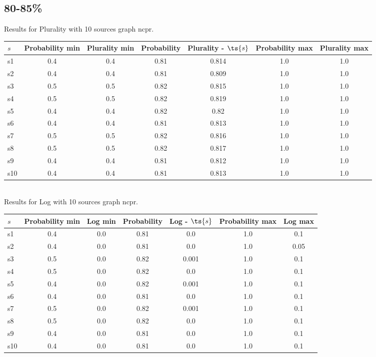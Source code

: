 \documentclass{article}
\begin{document}
\newpage

\subsection{80-85\%}

\noindent Results for Plurality with 10 sources graph ncpr.

\noindent\begin{tabular}{|l|c|c|c|c|c|c|}
\hline
$s$& Probability min & Plurality min & Probability & Plurality - $\ts{s}$ & Probability max & Plurality max\\
\hline
s1 &0.4 & 0.4 & 0.81 & 0.814 & 1.0 & 1.0\\
\hline
s2 &0.4 & 0.4 & 0.81 & 0.809 & 1.0 & 1.0\\
\hline
s3 &0.5 & 0.5 & 0.82 & 0.815 & 1.0 & 1.0\\
\hline
s4 &0.5 & 0.5 & 0.82 & 0.819 & 1.0 & 1.0\\
\hline
s5 &0.4 & 0.4 & 0.82 & 0.82 & 1.0 & 1.0\\
\hline
s6 &0.4 & 0.4 & 0.81 & 0.813 & 1.0 & 1.0\\
\hline
s7 &0.5 & 0.5 & 0.82 & 0.816 & 1.0 & 1.0\\
\hline
s8 &0.5 & 0.5 & 0.82 & 0.817 & 1.0 & 1.0\\
\hline
s9 &0.4 & 0.4 & 0.81 & 0.812 & 1.0 & 1.0\\
\hline
s10 &0.4 & 0.4 & 0.81 & 0.813 & 1.0 & 1.0\\
\hline
\end{tabular}\\

\noindent Results for Log with 10 sources graph ncpr.

\noindent\begin{tabular}{|l|c|c|c|c|c|c|}
\hline
$s$& Probability min & Log min & Probability & Log - $\ts{s}$ & Probability max & Log max\\
\hline
s1 &0.4 & 0.0 & 0.81 & 0.0 & 1.0 & 0.1\\
\hline
s2 &0.4 & 0.0 & 0.81 & 0.0 & 1.0 & 0.05\\
\hline
s3 &0.5 & 0.0 & 0.82 & 0.001 & 1.0 & 0.1\\
\hline
s4 &0.5 & 0.0 & 0.82 & 0.0 & 1.0 & 0.1\\
\hline
s5 &0.4 & 0.0 & 0.82 & 0.001 & 1.0 & 0.1\\
\hline
s6 &0.4 & 0.0 & 0.81 & 0.0 & 1.0 & 0.1\\
\hline
s7 &0.5 & 0.0 & 0.82 & 0.001 & 1.0 & 0.1\\
\hline
s8 &0.5 & 0.0 & 0.82 & 0.0 & 1.0 & 0.1\\
\hline
s9 &0.4 & 0.0 & 0.81 & 0.0 & 1.0 & 0.1\\
\hline
s10 &0.4 & 0.0 & 0.81 & 0.0 & 1.0 & 0.1\\
\hline
\end{tabular}\\
\end{document}
